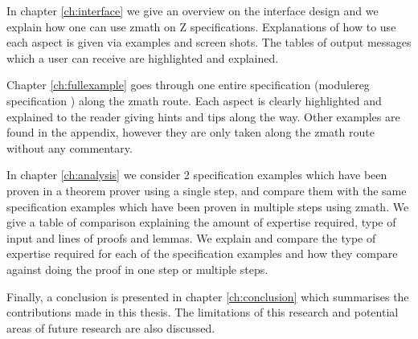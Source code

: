 In chapter \ref{ch:interface} we give an overview on the interface design and we explain how one can use \gls{zmath} on Z specifications. Explanations of how to use each aspect is given via examples and screen shots. The tables of output messages which a user can receive are highlighted and explained.

Chapter \ref{ch:fullexample} goes through one entire specification (modulereg specification \cite{essenceofz}) along the \gls{zmath} route. Each aspect is clearly highlighted and explained to the reader giving hints and tips along the way. Other examples are found in the appendix, however they are only taken along the \gls{zmath} route without any commentary.

In chapter \ref{ch:analysis} we consider 2 specification examples which have been proven in a theorem prover using a single step, and compare them with the same specification examples which have been proven in multiple steps using \gls{zmath}. We give a table of comparison explaining the amount of expertise required, type of input and lines of proofs and lemmas. We explain and compare the type of expertise required for each of the specification examples and how they compare against doing the proof in one step or multiple steps.

Finally, a conclusion is presented in chapter \ref{ch:conclusion} which summarises the contributions made in this thesis. The limitations of this research and potential areas of future research are also discussed.
